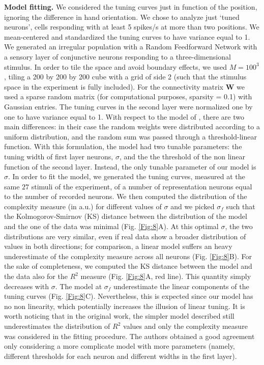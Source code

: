 \documentclass[a4paper]{article}%
\begin{document}
\textbf{Model fitting.} We considered the tuning
curves just in function of the position, ignoring the difference in hand
orientation. We chose to analyze just `tuned neurons', cells responding with
at least 5 spikes/s at more than two positions. We mean-centered and
standardized the tuning curves to have variance equal to 1.
We generated an irregular population with a Random Feedforward Network with a sensory layer of conjunctive neurons responding to a three-dimensional stimulus. In order to tile the space
and avoid boundary effects, we used $M= 100^{3}$, tiling a 200 by 200 by 200 cube
with a grid of side 2 (such that the stimulus space in the experiment is fully included). For the connectivity matrix $\mathbf{W}$ we used a
sparse random matrix (for computational purposes, sparsity = 0.1) with Gaussian entries. The tuning curves in the second layer
were normalized one by one to have variance equal to 1. With respect to the model of \cite{Lalazar2016TuningConnectivity}, there are two main differences: in their case the random weights were distributed according to a uniform distribution, and the random sum was passed through a threshold-linear function. With this formulation, the model had two tunable parameters: the tuning width of first layer neurons, $\sigma$, and the the threshold of the non linear function of the second layer. Instead, the  only tunable
parameter of our model is $\sigma$. In order to fit the model, we generated the tuning curves, measured at the same $27$ stimuli of the experiment,  of a number of representation neurons equal to the number of recorded neurons. We then computed the distribution of
the complexity measure (in a.u.) for different values of $\sigma$ and we picked
$\sigma_{f}$ such that the Kolmogorov-Smirnov (KS) distance between the
distribution of the model and the one of the data was minimal (Fig.
 \ref{Fig:8}A). At this optimal $\sigma$, the two distributions are very
similar, even if real data show a broader distribution of values in both
directions; for comparison, a linear model suffers an heavy underestimate of
the complexity measure across all neurons (Fig. \ref{Fig:8}B).
For the
sake of completeness, we computed the KS distance between the model and the
data also for the $R^2$ measure (Fig. \ref{Fig:8}A, red line). This quantity simply decreases with $\sigma$. The model at $\sigma_{f}$
underestimate the linear components of the tuning curves (Fig. \ref{Fig:8}C).
Nevertheless, this is expected since our model has no non linearity, which
potentially increases the illusion of linear tuning. It is worth noticing that
in the original work, the simpler model  described still
underestimates the distribution of $R^{2}$ values and only the complexity
measure was considered in the fitting procedure. The authors obtained a good
agreement only considering a more complicate model with more parameters
(namely, different thresholds for each neuron and different widths in the
first layer).
\end{document}
